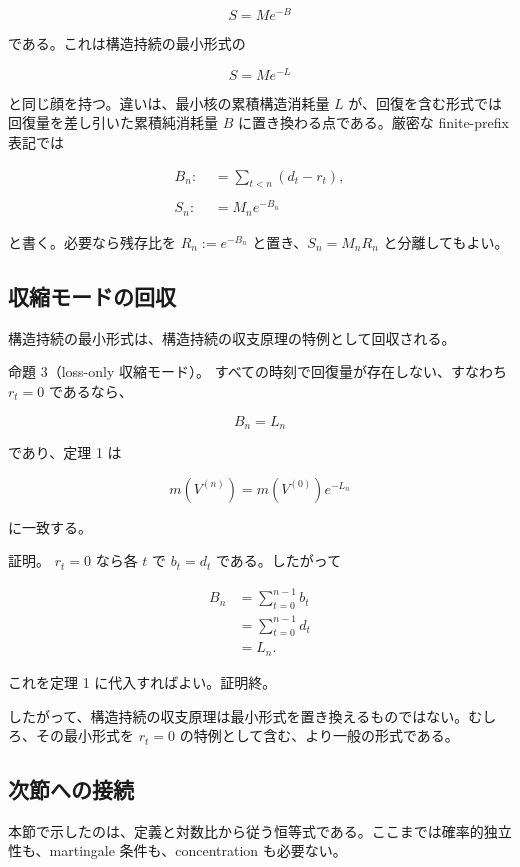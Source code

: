 \documentclass[12pt,a4paper]{article}
\begin{document}
\[
S = M e^{-B}
\]

である。これは構造持続の最小形式の

\[
S = M e^{-L}
\]

と同じ顔を持つ。違いは、最小核の累積構造消耗量 \(L\) が、回復を含む形式では回復量を差し引いた累積純消耗量 \(B\) に置き換わる点である。厳密な finite-prefix 表記では

\[
\begin{aligned}
B_{n} :&= \sum_{t<n}(d_{t}-r_{t}), \\
\qquad \\
S_{n} :&= M_{n} e^{-B_{n}}
\end{aligned}
\]

と書く。必要なら残存比を \(R_{n}:=e^{-B_{n}}\) と置き、\(S_{n}=M_{n} R_{n}\) と分離してもよい。

\subsection{収縮モードの回収}\label{ux53ceux7e2eux30e2ux30fcux30c9ux306eux56deux53ce}

構造持続の最小形式は、構造持続の収支原理の特例として回収される。

命題 3（loss-only 収縮モード）。 すべての時刻で回復量が存在しない、すなわち \(r_{t}=0\) であるなら、

\[
B_{n} = L_{n}
\]

であり、定理 1 は

\[
m(V^{(n)}) = m(V^{(0)}) e^{-L_{n}}
\]

に一致する。

証明。 \(r_{t}=0\) なら各 \(t\) で \(b_{t}=d_{t}\) である。したがって

\[
\begin{aligned}
B_{n} &= \sum_{t=0}^{n-1} b_{t} \\
&= \sum_{t=0}^{n-1} d_{t} \\
&= L_{n}.
\end{aligned}
\]

これを定理 1 に代入すればよい。証明終。

したがって、構造持続の収支原理は最小形式を置き換えるものではない。むしろ、その最小形式を \(r_{t}=0\) の特例として含む、より一般の形式である。

\subsection{次節への接続}\label{ux6b21ux7bc0ux3078ux306eux63a5ux7d9a}

本節で示したのは、定義と対数比から従う恒等式である。ここまでは確率的独立性も、martingale 条件も、concentration も必要ない。
\end{document}
